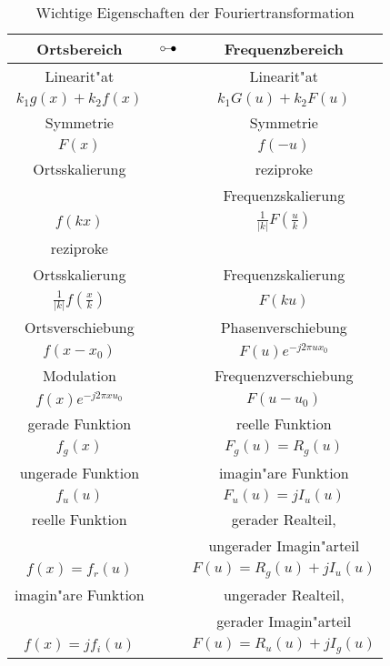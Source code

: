 \begin{table}[!h]
 \begin{center}
  \begin{tabular}{|ccc|}
 \hline
 Ortsbereich &$\circ \hspace{-0.15cm} - \hspace{-0.15cm} \bullet$& Frequenzbereich\\\hline
 \hline
 Linearit"at &&  Linearit"at \\
 $k_{1}g(x)+k_{2}f(x)$ && $k_{1}G(u)+k_{2}F(u)$ \\\hline

 Symmetrie   &&  Symmetrie \\
 $F(x)$ && $f(-u)$ \\\hline

 Ortsskalierung && reziproke\\
 && Frequenzskalierung \\
 $f(kx)$ && $\frac{1}{|k|}F(\frac{u}{k})$\\\hline

 reziproke&&\\
 Ortsskalierung && Frequenzskalierung \\
 $\frac{1}{|k|}f(\frac{x}{k})$ && $F(ku)$\\\hline

 Ortsverschiebung && Phasenverschiebung \\
 $f(x-x_{0})$ && $F(u) e^{ -j 2 \pi u x_{0} }$\\\hline

 Modulation && Frequenzverschiebung \\
 $f(x) e^{ -j 2 \pi x u_{0} }$ && $F(u-u_{0})$\\\hline

 gerade Funktion && reelle Funktion \\
 $f_{g}(x)$ && $F_{g}(u)=R_{g}(u)$\\\hline

 ungerade Funktion && imagin"are Funktion \\
 $f_{u}(u)$ && $F_{u}(u)=jI_{u}(u)$\\\hline

 reelle Funktion && gerader Realteil,\\
 && ungerader Imagin"arteil \\
 $f(x)=f_{r}(u)$ && $F(u)=R_{g}(u)+j I_{u}(u)$\\\hline

 imagin"are Funktion && ungerader Realteil, \\
 && gerader Imagin"arteil \\
 $f(x)=j f_{i}(u)$ && $F(u)=R_{u}(u)+j I_{g}(u)$\\\hline

  \end{tabular}
 \end{center}
 \caption[Wichtige Eigenschaften der Fouriertransformation]{
Wichtige Eigenschaften der Fouriertransformation}
 \label{tableeigenft}
\end{table}
